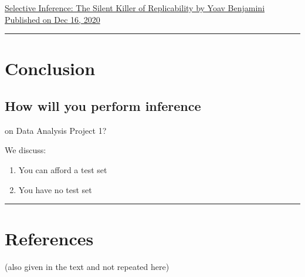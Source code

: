 \documentclass[
  letterpaper,
  DIV=11,
  numbers=noendperiod]{scrartcl}
\providecommand{\tightlist}{%
  \setlength{\itemsep}{0pt}\setlength{\parskip}{0pt}}\usepackage{longtable,booktabs,array}
\begin{document}
\href{https://hdsr.mitpress.mit.edu/pub/l39rpgyc/release/1}{Selective
Inference: The Silent Killer of Replicability by Yoav Benjamini
Published on Dec 16, 2020}

\begin{center}\rule{0.5\linewidth}{0.5pt}\end{center}

\hypertarget{conclusion-1}{%
\section{Conclusion}\label{conclusion-1}}

\hypertarget{how-will-you-perform-inference}{%
\subsection{How will you perform
inference}\label{how-will-you-perform-inference}}

on Data Analysis Project 1?

We discuss:

\begin{enumerate}
\def\labelenumi{\arabic{enumi})}
\tightlist
\item
  You can afford a test set
\item
  You have no test set
\end{enumerate}

\begin{center}\rule{0.5\linewidth}{0.5pt}\end{center}

\hypertarget{references}{%
\section{References}\label{references}}

(also given in the text and not repeated here)
\end{document}
